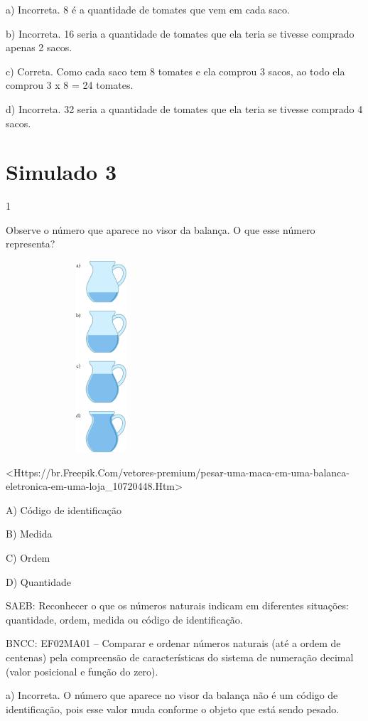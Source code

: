 \begin{escolha}
\begin{escolha}
{{{{a) Incorreta. 8 é a quantidade de tomates que vem em cada saco.

b) Incorreta. 16 seria a quantidade de tomates que ela teria se tivesse
comprado apenas 2 sacos.

c) Correta. Como cada saco tem 8 tomates e ela comprou 3 sacos, ao todo
ela comprou 3 x 8 = 24 tomates.

d) Incorreta. 32 seria a quantidade de tomates que ela teria se tivesse
comprado 4 sacos.

\chapter{Simulado 3}

\num{1}

Observe o número que aparece no visor da balança. O que esse número
representa?

\includegraphics[width=2.80208in,height=2.80208in]{media/image141.png}

\textless{}Https://br.Freepik.Com/vetores-premium/pesar-uma-maca-em-uma-balanca-eletronica-em-uma-loja\_10720448.Htm\textgreater{}

A) Código de identificação

B) Medida

C) Ordem

D) Quantidade

SAEB: Reconhecer o que os números naturais indicam em diferentes
situações: quantidade, ordem, medida ou código de identificação.

BNCC: EF02MA01 -- Comparar e ordenar números naturais (até a ordem de
centenas) pela compreensão de características do sistema de numeração
decimal (valor posicional e função do zero).

a) Incorreta. O número que aparece no visor da balança não é um código
de identificação, pois esse valor muda conforme o objeto que está sendo
pesado.

}}}}
\end{escolha}
\end{escolha}
